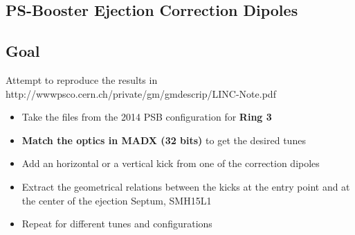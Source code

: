 \documentclass[11pt,letter,english]{article}
\begin{document}
\nocite{*} 

\small
\newcommand*{\data}{\ifcase\month\or
  January\or February\or March\or April\or May\or June\or
  July\or August\or September\or October\or November\or December\fi
  \space\number\day th,\space\number\year}
\newcommand{\blue}    {\color[named]{Blue}}
\newcommand{\black}   {\color[named]{Black}}
\newcommand{\red}     {\color[named]{Red}}
\newcommand{\green}   {\color[named]{Green}}
\newcommand{\orange}  {\color[named]{Orange}}
\newcommand{\yellow}  {\color[named]{Yellow}}
\newcommand{\magenta} {\color[named]{Magenta}}
\newcommand{\cyan}    {\color[named]{Cyan}}

\def\CP{{\sffamily CP}}

\begin{center}
 \section*{\huge{PS-Booster Ejection Correction Dipoles}} 
 \vspace {0.6cm}
\end{center}

\subsection*{Goal}

Attempt to reproduce the results in http://wwwpsco.cern.ch/private/gm/gmdescrip/LINC-Note.pdf

\begin{itemize}
\item{Take the files from the 2014 PSB configuration for {\bf Ring 3}}
\item{{\bf Match the optics in MADX (32 bits)} to get the desired tunes}
\item{Add an horizontal or a vertical kick from one of the correction dipoles}
\item{Extract the geometrical relations between the kicks at the entry point and at the center of the ejection Septum, SMH15L1}
\item{Repeat for different tunes and configurations}
\end{itemize}
\end{document}
